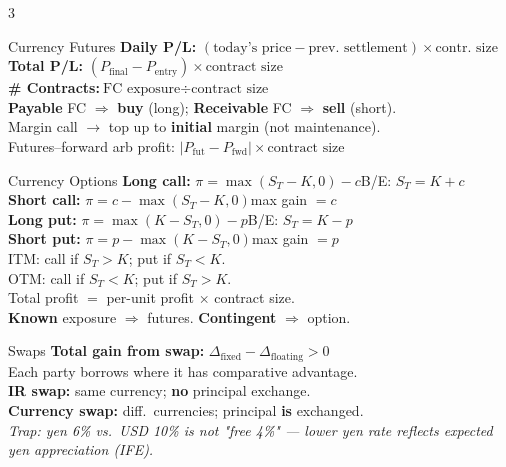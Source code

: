 \documentclass[7.5pt,a4paper]{article}
\newcommand{\kw}[1]{\textbf{#1}}
\newcommand{\ex}[1]{\textit{\fontsize{5.8}{7}\selectfont #1}}
\begin{document}
\begin{multicols}{3}
\begin{fsect}{Currency Futures}
\kw{Daily P/L:}
$(\text{today's price}-\text{prev.\ settlement})\times\text{contr.\ size}$\\[1pt]
\kw{Total P/L:}
$(P_{\text{final}}-P_{\text{entry}})\times\text{contract size}$\\[1pt]
\kw{\# Contracts:}\quad $\text{FC exposure}\div\text{contract size}$\\[1pt]
\kw{Payable} FC $\Rightarrow$ \kw{buy} (long);\quad
\kw{Receivable} FC $\Rightarrow$ \kw{sell} (short).\\[1pt]
Margin call $\to$ top up to \kw{initial} margin (not maintenance).\\[1pt]
Futures--forward arb profit:
$|P_{\text{fut}}-P_{\text{fwd}}|\times\text{contract size}$
\end{fsect}

\begin{fsect}{Currency Options}
\kw{Long call:}\quad
$\pi=\max(S_T{-}K,0)-c$\quad B/E: $S_T=K+c$\\
\kw{Short call:}\quad
$\pi=c-\max(S_T{-}K,0)$\quad max gain $=c$\\
\kw{Long put:}\quad
$\pi=\max(K{-}S_T,0)-p$\quad B/E: $S_T=K-p$\\
\kw{Short put:}\quad
$\pi=p-\max(K{-}S_T,0)$\quad max gain $=p$\\[1pt]
ITM: call if $S_T>K$;\; put if $S_T<K$.\\
OTM: call if $S_T<K$;\; put if $S_T>K$.\\[1pt]
Total profit $=$ per-unit profit $\times$ contract size.\\
\kw{Known} exposure $\Rightarrow$ futures.\quad
\kw{Contingent} $\Rightarrow$ option.
\end{fsect}

\begin{fsect}{Swaps}
\kw{Total gain from swap:}\quad
$\Delta_{\text{fixed}}-\Delta_{\text{floating}}>0$\\
Each party borrows where it has comparative advantage.\\[1pt]
\kw{IR swap:} same currency; \kw{no} principal exchange.\\
\kw{Currency swap:} diff.\ currencies; principal \kw{is} exchanged.\\[1pt]
\ex{Trap: yen 6\% vs.\ USD 10\% is not "free 4\%" --- lower yen rate reflects expected yen appreciation (IFE).}
\end{fsect}

\end{multicols}
\end{document}
